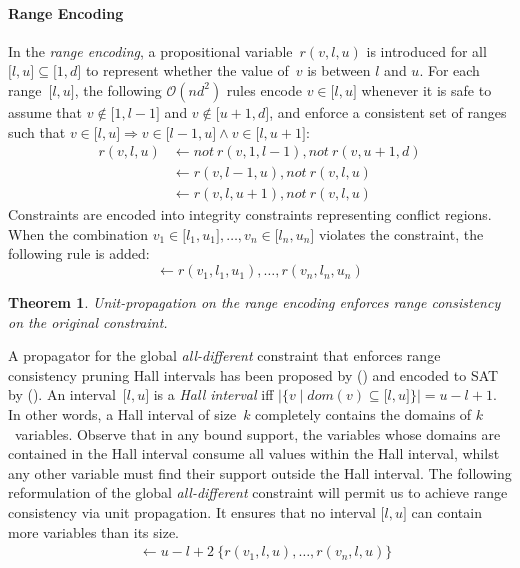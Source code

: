 \documentclass[letterpaper]{article}
\newtheorem{theorem}{Theorem}
\newcommand{\dneg}{not\ }
\newcommand{\citeap}[1]{\citeauthor{#1} (\citeyear{#1})}
\begin{document}
\paragraph{Range Encoding}
In the \emph{range encoding}, a propositional variable~$r(v, l, u)$ is introduced for all $\lbrack l, u \rbrack \subseteq \lbrack 1, d \rbrack$ to represent whether the value of~$v$ is between $l$ and $u$. For each range~$\lbrack l, u \rbrack$, the following $\mathcal{O}(nd^2)$ rules encode $v \in \lbrack l , u \rbrack$ whenever it is safe to assume that $v \not\in \lbrack 1, l-1 \rbrack$ and $v \not\in \lbrack u+1, d\rbrack$, and enforce a consistent set of ranges such that $v \in \lbrack l, u\rbrack \Rightarrow v \in \lbrack l-1, u\rbrack \land v \in \lbrack l, u+1\rbrack$:
\begin{align}
r(v, l, u) &\leftarrow \dneg r(v, 1, l-1), \dneg r(v, u+1, d) \\
&\leftarrow r(v, l-1, u), \dneg r(v, l, u) \\
&\leftarrow r(v, l, u+1), \dneg r(v, l, u)
\end{align}
Constraints are encoded into integrity constraints representing conflict regions. When the combination $v_1 \in \lbrack l_1, u_1\rbrack, \dots, v_n \in \lbrack l_n, u_n\rbrack$ violates the constraint, the following rule is added:
\[
\leftarrow r(v_1, l_1, u_1), \dots, r(v_n, l_n, u_n)
\]
\begin{theorem}
Unit-propagation on the range encoding enforces range consistency on the original constraint.
\end{theorem}
A propagator for the global \emph{all-different} constraint that enforces range consistency pruning Hall intervals has been proposed by \citeap{le96a} and encoded to SAT by \citeap{bekanaquwa09a}.
An interval~$\lbrack l, u \rbrack$ is a \emph{Hall interval} iff $|\{ v \mid dom(v) \subseteq \lbrack l, u \rbrack \}| = u - l + 1$. In other words, a Hall interval of size~$k$ completely contains the domains of $k$~variables. Observe that in any bound support, the variables whose domains are contained in the Hall interval consume all values within the Hall interval, whilst any other variable must find their support outside the Hall interval.
The following reformulation of the global \emph{all-different} constraint will permit us to achieve range consistency via unit propagation. It ensures that no interval $\lbrack l, u\rbrack$ can contain more variables than its size. 
\begin{align}
&\leftarrow u-l+2\ \{ r(v_1, l, u), \dots, r(v_n, l, u) \}
\end{align}
\end{document}
